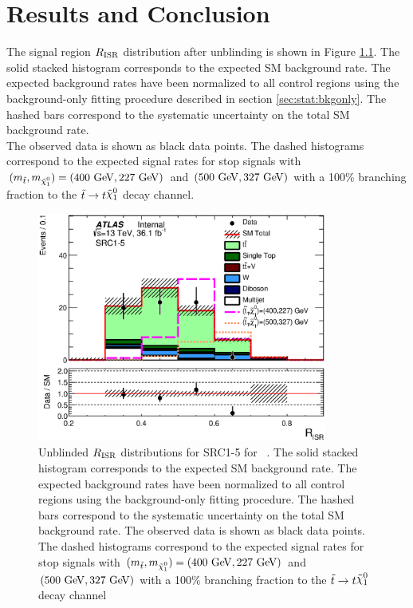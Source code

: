\chapter{Results and Conclusion}
\label{chap:Results}

\indent The signal region $R_{\mathrm{ISR}}$ distribution after unblinding is shown in Figure \ref{fig:SRCUnblined}.  The solid stacked histogram corresponds to the expected SM background rate.  The expected background rates have been normalized to all control regions using the background-only fitting procedure described in section \ref{sec:stat:bkgonly}.  The hashed bars correspond to the systematic uncertainty on the total SM background rate.  \\

\indent The observed data is shown as black data points. The dashed histograms correspond to the expected signal rates for stop signals with $(m_{\stop}, m_{\ninoone}) = (400 \gev, 227 \gev)$ and $(500 \gev, 327 \gev)$ with a 100\% branching fraction to the $\stop \rightarrow t \ninoone$ decay channel.  \\%

\begin{figure}[!h] 
\begin{center}
\includegraphics[width=0.85\textwidth]{figures/SRC/CA_RISR_SRC1_5}
\end{center}
\caption[Unblinded $\rISR$  distributions for SRC1-5 for \intlumi\ \ifb.]{Unblinded $\rISR$  distributions for SRC1-5 for \intlumi\ \ifb.   The solid stacked histogram corresponds to the expected SM background rate.  The expected background rates have been normalized to all control regions using the background-only fitting procedure.  The hashed bars correspond to the systematic uncertainty on the total SM background rate. The observed data is shown as black data points. The dashed histograms correspond to the expected signal rates for stop signals with $(m_{\stop}, m_{\ninoone}) = (400 \gev, 227 \gev)$ and $(500 \gev, 327 \gev)$ with a 100\% branching fraction to the $\stop \rightarrow t \ninoone$ decay channel}
\label{fig:SRCUnblined}
\end{figure}

